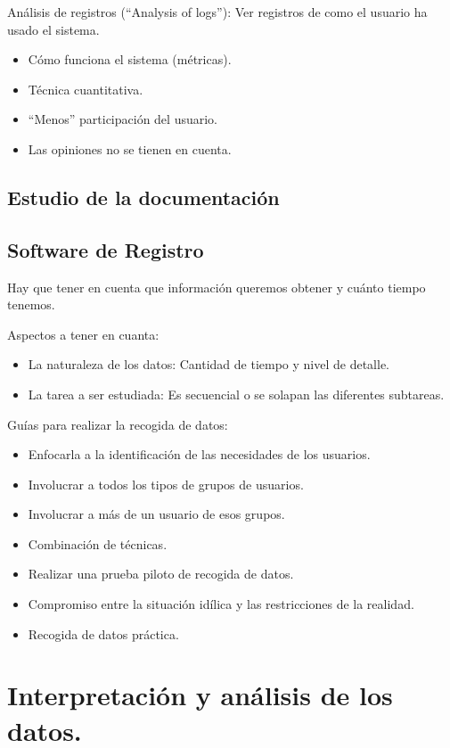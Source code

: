 \documentclass[12pt, twoside, openright]{report} %
\begin{document}
Análisis de registros (\enquote{Analysis of logs}): Ver registros de
como el usuario ha usado el sistema.

\begin{itemize}
	\item Cómo funciona el sistema (métricas).
	\item Técnica cuantitativa.
	\item \enquote{Menos} participación del usuario.
	\item Las opiniones no se tienen en cuenta.
\end{itemize}

\subsection{Estudio de la documentación}
\subsection{Software de Registro}
\pagebreak
Hay que tener en cuenta que información queremos obtener y cuánto
tiempo tenemos.

Aspectos a tener en cuanta:

\begin{itemize}
	\item La naturaleza de los datos: Cantidad de tiempo y nivel de detalle.
	\item La tarea a ser estudiada: Es secuencial o se solapan las
	      diferentes subtareas.
\end{itemize}

Guías para realizar la recogida de datos:

\begin{itemize}
	\item Enfocarla a la identificación de las necesidades de los usuarios.
	\item Involucrar a todos los tipos de grupos de usuarios.
	\item Involucrar a más de un usuario de esos grupos.
	\item Combinación de técnicas.
	\item Realizar una prueba piloto de recogida de datos.
	\item Compromiso entre la situación idílica y las restricciones de la
	      realidad.
	\item Recogida de datos práctica.
\end{itemize}


\section{Interpretación y análisis de los datos.}
\end{document}
